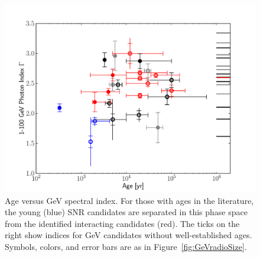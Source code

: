 \begin{figure}[h!]
	\centering
	\includegraphics[width=1.0\columnwidth]{figures/age_vs_index.pdf}
	\caption[Age versus GeV spectral index]{Age versus GeV spectral index. For those with ages in the literature, the young (blue) SNR candidates are separated in this phase space from the identified interacting candidates (red). The ticks on the right show indices for GeV candidates without well-established ages. Symbols, colors, and error bars are as in Figure~\ref{fig:GeVradioSize}. 
		\label{fig:AgeGeVIndex}}
\end{figure}

